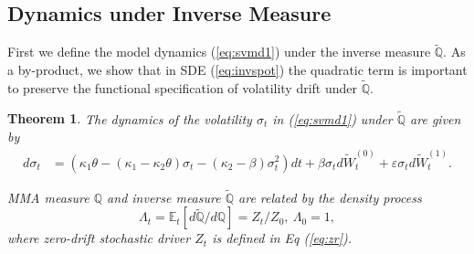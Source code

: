 \documentclass[pdftex,11pt,a4paper] {article}
\newtheorem{theorem}{Theorem}[section]
\begin{document}
\subsection{Dynamics under Inverse Measure}\label{sc:emma}


First we define the model dynamics (\ref{eq:svmd1}) under the inverse measure $\mathbb{\tilde{Q}}$. As a by-product, we show that in SDE (\ref{eq:invspot}) the quadratic term is important to preserve the functional specification of volatility drift under $\mathbb{\tilde{Q}}$. 

\begin{theorem}\label{thm:inverse_meas}
The dynamics of the volatility $\sigma_{t}$ in (\ref{eq:svmd1}) under $\mathbb{\tilde{Q}}$ are given by
\begin{equation}\label{eq:invspot}
\begin{split}
d\sigma_{t}& =\left(\kappa_{1} \theta - \left(\kappa_{1} - \kappa_{2}\theta \right)\sigma_{t}- \left(\kappa_{2}-\beta\right)\sigma_{t}^{2} \right)dt+  \beta  \sigma_{t}d\widetilde W^{(0)}_{t} +  \varepsilon \sigma_{t} d\widetilde W^{(1)}_{t}.
\end{split}
\end{equation}

MMA measure $\mathbb{Q}$ and inverse measure $\tilde{\mathbb{Q}}$ are related by the density process
\begin{equation}\label{eq:dens_process}
\Lambda_t=\mathbb{E}_t\left[d\tilde{\mathbb{Q}}/d\mathbb{Q}\right]=Z_t/Z_0, \ \Lambda_{0}=1,
\end{equation}
where zero-drift stochastic driver $Z_t$ is defined in Eq (\ref{eq:zr}).
\end{theorem}
\end{document}
